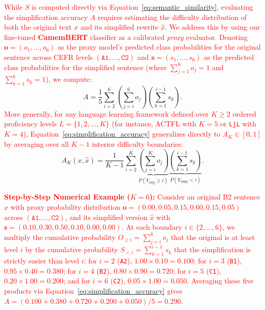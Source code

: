 \textcolor{red}{While $S$ is computed directly via Equation~\ref{eq:semantic_similarity}, evaluating the simplification accuracy $A$ requires estimating the difficulty distribution of both the original text $x$ and its simplified rewrite $\hat{x}$. We address this by using our fine-tuned \textbf{CamemBERT} classifier as a calibrated \textit{proxy} evaluator. Denoting $\mathbf{o} = (o_1, \dots, o_6)$ as the proxy model's predicted class probabilities for the original sentence across CEFR levels $(\texttt{A1}, \dots, \texttt{C2})$ and $\mathbf{s} = (s_1, \dots, s_6)$ as the predicted class probabilities for the simplified sentence (where $\sum_{j=1}^6 o_j = 1$ and $\sum_{k=1}^6 s_k = 1$), we compute:}
{\color{red}\begin{equation}
    A = \frac{1}{5} \sum_{i=2}^{6} \left( \sum_{j=i}^{6} o_j \right) \left( \sum_{k=1}^{i-1} s_k \right).
    \label{eq:simplification_accuracy}
\end{equation}}
\textcolor{red}{More generally, for any language learning framework defined over $K \ge 2$ ordered proficiency levels $L = \{1, 2, \dots, K\}$ (for instance, ACTFL with $K=5$ or \texttt{LjL} with $K=4$), Equation~\ref{eq:simplification_accuracy} generalizes directly to $A_K \in [0, 1]$ by averaging over all $K - 1$ interior difficulty boundaries:}
{\color{red}\begin{equation}
    A_K(x, \hat{x}) = \frac{1}{K - 1} \sum_{i=2}^{K} \underbrace{\left( \sum_{j=i}^{K} o_j \right)}_{P(Y_{\text{orig}} \ge i)} \underbrace{\left( \sum_{k=1}^{i-1} s_k \right)}_{P(Y_{\text{simp}} < i)}.
    \label{eq:simplification_accuracy_general}
\end{equation}}

\textcolor{red}{\noindent\textbf{Step-by-Step Numerical Example ($K = 6$):} Consider an original B2 sentence $x$ with proxy probability distribution $\mathbf{o} = (0.00, 0.05, 0.15, 0.60, 0.15, 0.05)$ across $(\texttt{A1}, \dots, \texttt{C2})$, and its simplified version $\hat{x}$ with $\mathbf{s} = (0.10, 0.30, 0.50, 0.10, 0.00, 0.00)$. At each boundary $i \in \{2, \dots, 6\}$, we multiply the cumulative probability $O_{\ge i} = \sum_{j=i}^6 o_j$ that the original is at least level $i$ by the cumulative probability $S_{< i} = \sum_{k=1}^{i-1} s_k$ that the simplification is strictly easier than level $i$: for $i=2$ (\texttt{A2}), $1.00 \times 0.10 = 0.100$; for $i=3$ (\texttt{B1}), $0.95 \times 0.40 = 0.380$; for $i=4$ (\texttt{B2}), $0.80 \times 0.90 = 0.720$; for $i=5$ (\texttt{C1}), $0.20 \times 1.00 = 0.200$; and for $i=6$ (\texttt{C2}), $0.05 \times 1.00 = 0.050$. Averaging these five products via Equation~\ref{eq:simplification_accuracy} gives $A = (0.100 + 0.380 + 0.720 + 0.200 + 0.050)/5 = 0.290$.}


